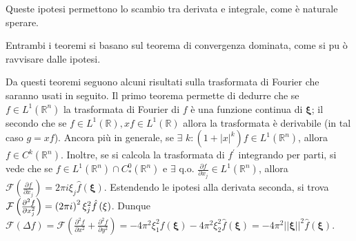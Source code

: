 \documentclass{article}
\begin{document}
Queste ipotesi permettono lo scambio tra derivata e integrale, come \`{e}
naturale sperare.

Entrambi i teoremi si basano sul teorema di convergenza dominata, come si pu%
\`{o} ravvisare dalle ipotesi.

Da questi teoremi seguono alcuni risultati sulla trasformata di Fourier che
saranno usati in seguito. Il primo teorema permette di dedurre che se $f\in
L^{1}\left( 
\mathbb{R}
^{n}\right) $ la trasformata di Fourier di $f$ \`{e} una funzione continua
di $\mathbf{\xi }$; il secondo che se $f\in L^{1}\left( 
\mathbb{R}
\right) ,xf\in L^{1}\left( 
\mathbb{R}
\right) $ allora la trasformata \`{e} derivabile (in tal caso $g=xf$).
Ancora pi\`{u} in generale, se $\exists $ $k:\left( 1+\left\vert
x\right\vert ^{k}\right) f\in L^{1}\left( 
\mathbb{R}
^{n}\right) $, allora $f\in C^{k}\left( 
\mathbb{R}
^{n}\right) $. Inoltre, se si calcola la trasformata di $f^{\prime }$
integrando per parti, si vede che se $f\in L^{1}\left( 
\mathbb{R}
^{n}\right) \cap C_{\ast }^{0}\left( 
\mathbb{R}
^{n}\right) $ e $\exists $ q.o. $\frac{\partial f}{\partial x_{j}}\in
L^{1}\left( 
\mathbb{R}
^{n}\right) $, allora $\mathcal{F}\left( \frac{\partial f}{\partial x_{j}}%
\right) =2\pi i\xi _{j}\hat{f}\left( \mathbf{\xi }\right) $. Estendendo le
ipotesi alla derivata seconda, si trova $\mathcal{F}\left( \frac{\partial
^{2}f}{\partial x_{j}^{2}}\right) =\left( 2\pi i\right) ^{2}\xi _{j}^{2}\hat{%
f}\left( \mathbf{\xi }\right) $. Dunque $\mathcal{F}\left( \Delta f\right) =%
\mathcal{F}\left( \frac{\partial ^{2}f}{\partial x^{2}}+\frac{\partial ^{2}f%
}{\partial y^{2}}\right) =-4\pi ^{2}\xi _{1}^{2}\hat{f}\left( \mathbf{\xi }%
\right) -4\pi ^{2}\xi _{2}^{2}\hat{f}\left( \mathbf{\xi }\right) =-4\pi
^{2}\left\vert \left\vert \mathbf{\xi }\right\vert \right\vert ^{2}\hat{f}%
\left( \mathbf{\xi }\right) $.
\end{document}
